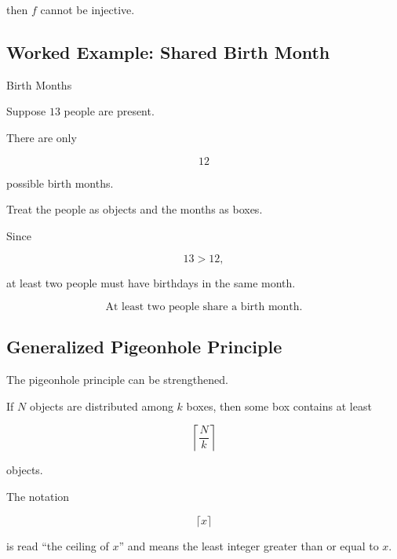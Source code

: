 then \(f\) cannot be injective.

\subsection{Worked Example: Shared Birth Month}
\label{subsec:worked-pigeonhole}

\begin{workedexamplebox}{Birth Months}

Suppose \(13\) people are present.

There are only

\[
12
\]

possible birth months.

Treat the people as objects and the months as boxes.

Since

\[
13>12,
\]

at least two people must have birthdays in the same month.

\begin{answerbox}
\[
\boxed{
\text{At least two people share a birth month.}
}
\]
\end{answerbox}

\end{workedexamplebox}

\subsection{Generalized Pigeonhole Principle}
\label{subsec:generalized-pigeonhole}

The pigeonhole principle can be strengthened.

\begin{theorem}
If \(N\) objects are distributed among \(k\) boxes, then some box
contains at least

\[
\boxed{
\left\lceil \frac{N}{k}\right\rceil
}
\]

objects.
\end{theorem}

The notation

\[
\lceil x\rceil
\]

is read ``the ceiling of \(x\)'' and means the least integer greater
than or equal to \(x\).


